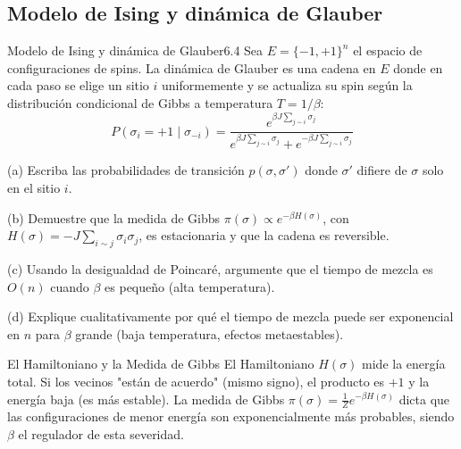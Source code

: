 \documentclass[10pt,a4paper]{article}
\begin{document}
\newpage

\subsection{Modelo de Ising y dinámica de Glauber}


\begin{ejercicio}{Modelo de Ising y dinámica de Glauber}{6.4}
    Sea $E = \{-1, +1\}^n$ el espacio de configuraciones de spins. La dinámica de Glauber es una cadena en $E$ donde en cada paso se elige un sitio $i$ uniformemente y se actualiza su spin según la distribución condicional de Gibbs a temperatura $T = 1/\beta$:
    \[ P(\sigma_i = +1 \mid \sigma_{-i}) = \frac{e^{\beta J \sum_{j \sim i} \sigma_j}}{e^{\beta J \sum_{j \sim i} \sigma_j} + e^{-\beta J \sum_{j \sim i} \sigma_j}} \]
    
    (a) Escriba las probabilidades de transición $p(\sigma, \sigma')$ donde $\sigma'$ difiere de $\sigma$ solo en el sitio $i$.
    
    (b) Demuestre que la medida de Gibbs $\pi(\sigma) \propto e^{-\beta H(\sigma)}$, con $H(\sigma) = -J \sum_{i \sim j} \sigma_i \sigma_j$, es estacionaria y que la cadena es reversible.
    
    (c) Usando la desigualdad de Poincaré, argumente que el tiempo de mezcla es $O(n)$ cuando $\beta$ es pequeño (alta temperatura).
    
    (d) Explique cualitativamente por qué el tiempo de mezcla puede ser exponencial en $n$ para $\beta$ grande (baja temperatura, efectos metaestables).
\end{ejercicio}

\vspace{2mm}

\begin{nota}{El Hamiltoniano y la Medida de Gibbs}
    El Hamiltoniano $H(\sigma)$ mide la energía total. Si los vecinos "están de acuerdo" (mismo signo), el producto es $+1$ y la energía baja (es más estable). La medida de Gibbs $\pi(\sigma) = \frac{1}{Z} e^{-\beta H(\sigma)}$ dicta que las configuraciones de menor energía son exponencialmente más probables, siendo $\beta$ el regulador de esta severidad.
\end{nota}
\end{document}
